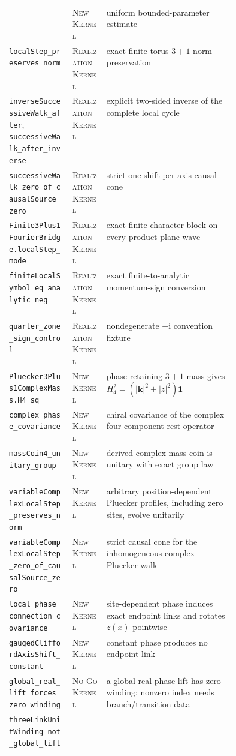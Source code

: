 \documentclass[11pt]{article}
\newcommand{\Kernel}{\textcolor{kernelcolor}{\textsc{Kernel}}}
\newcommand{\NewResult}{\textsc{New}}
\newcommand{\Realization}{\textsc{Realization}}
\newcommand{\NoGo}{\textsc{No-Go}}
\newcommand{\ii}{\mathrm{i}}
\newcommand{\id}{\mathbf{1}}
\begin{document}
\begin{center}
\begin{tabularx}{\linewidth}{@{}p{0.29\linewidth}p{0.15\linewidth}X@{}}
 & \NewResult{} \Kernel{} & uniform bounded-parameter estimate\\
\texttt{localStep\_preserves\_norm}
 & \Realization{} \Kernel{} & exact finite-torus $3+1$ norm preservation\\
\texttt{inverseSuccessiveWalk\_after}, \texttt{successiveWalk\_after\_inverse}
 & \Realization{} \Kernel{} & explicit two-sided inverse of the complete local cycle\\
\texttt{successiveWalk\_zero\_of\_causalSource\_zero}
 & \Realization{} \Kernel{} & strict one-shift-per-axis causal cone\\
\texttt{Finite3Plus1FourierBridge.localStep\_mode}
 & \Realization{} \Kernel{} & exact finite-character block on every product plane wave\\
\texttt{finiteLocalSymbol\_eq\_analytic\_neg}
 & \Realization{} \Kernel{} & exact finite-to-analytic momentum-sign conversion\\
\texttt{quarter\_zone\_sign\_control}
 & \Realization{} \Kernel{} & nondegenerate $-\ii$ convention fixture\\
\texttt{Pluecker3Plus1ComplexMass.H4\_sq}
 & \NewResult{} \Kernel{} & phase-retaining $3+1$ mass gives $H_4^2=(|\mathbf k|^2+|z|^2)\id$\\
\texttt{complex\_phase\_covariance}
 & \NewResult{} \Kernel{} & chiral covariance of the complex four-component rest operator\\
\texttt{massCoin4\_unitary\_group}
 & \NewResult{} \Kernel{} & derived complex mass coin is unitary with exact group law\\
\texttt{variableComplexLocalStep\_preserves\_norm}
 & \NewResult{} \Kernel{} & arbitrary position-dependent Pluecker profiles, including zero sites, evolve unitarily\\
\texttt{variableComplexLocalStep\_zero\_of\_causalSource\_zero}
 & \NewResult{} \Kernel{} & strict causal cone for the inhomogeneous complex-Pluecker walk\\
\texttt{local\_phase\_connection\_covariance}
 & \NewResult{} \Kernel{} & site-dependent phase induces exact endpoint links and rotates $z(x)$ pointwise\\
\texttt{gaugedCliffordAxisShift\_constant}
 & \NewResult{} \Kernel{} & constant phase produces no endpoint link\\
\texttt{global\_real\_lift\_forces\_zero\_winding}
 & \NoGo{} \Kernel{} & a global real phase lift has zero winding; nonzero index needs branch/transition data\\
\texttt{threeLinkUnitWinding\_not\_global\_lift}

\end{tabularx}
\end{center}
\end{document}
